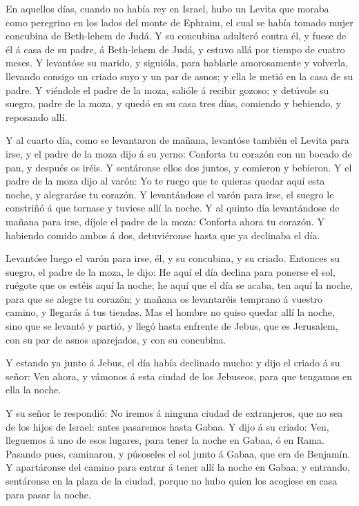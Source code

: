  En aquellos días, cuando no había rey en Israel, hubo un
Levita que moraba como peregrino en los lados del monte de Ephraim, el
cual se había tomado mujer concubina de Beth-lehem de Judá. 
Y su concubina adulteró contra él, y fuese de él á casa de su padre, á
Beth-lehem de Judá, y estuvo allá por tiempo de cuatro meses.
 Y levantóse su marido, y siguióla, para hablarle
amorosamente y volverla, llevando consigo un criado suyo y un par de
asnos; y ella le metió en la casa de su padre.  Y viéndole
el padre de la moza, salióle á recibir gozoso; y detúvole su suegro,
padre de la moza, y quedó en su casa tres días, comiendo y bebiendo, y
reposando allí.

 Y al cuarto día, como se levantaron de mañana, levantóse
también el Levita para irse, y el padre de la moza dijo á su yerno:
Conforta tu corazón con un bocado de pan, y después os iréis.
 Y sentáronse ellos dos juntos, y comieron y bebieron. Y el
padre de la moza dijo al varón: Yo te ruego que te quieras quedar aquí
esta noche, y alegraráse tu corazón.  Y levantándose el
varón para irse, el suegro le constriñó á que tornase y tuviese allí la
noche.  Y al quinto día levantándose de mañana para irse,
díjole el padre de la moza: Conforta ahora tu corazón. Y habiendo comido
ambos á dos, detuviéronse hasta que ya declinaba el día.

 Levantóse luego el varón para irse, él, y su concubina, y
su criado. Entonces su suegro, el padre de la moza, le dijo: He aquí el
día declina para ponerse el sol, ruégote que os estéis aquí la noche; he
aquí que el día se acaba, ten aquí la noche, para que se alegre tu
corazón; y mañana os levantaréis temprano á vuestro camino, y llegarás á
tus tiendas.  Mas el hombre no quiso quedar allí la noche,
sino que se levantó y partió, y llegó hasta enfrente de Jebus, que es
Jerusalem, con su par de asnos aparejados, y con su concubina.

 Y estando ya junto á Jebus, el día había declinado mucho:
y dijo el criado á su señor: Ven ahora, y vámonos á esta ciudad de los
Jebuseos, para que tengamos en ella la noche.

 Y su señor le respondió: No iremos á ninguna ciudad de
extranjeros, que no sea de los hijos de Israel: antes pasaremos hasta
Gabaa. Y dijo á su criado:  Ven, lleguemos á uno de esos
lugares, para tener la noche en Gabaa, ó en Rama.  Pasando
pues, caminaron, y púsoseles el sol junto á Gabaa, que era de Benjamín.
 Y apartáronse del camino para entrar á tener allí la noche
en Gabaa; y entrando, sentáronse en la plaza de la ciudad, porque no
hubo quien los acogiese en casa para pasar la noche.

